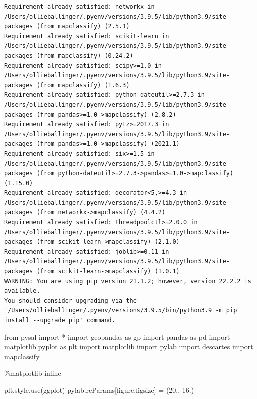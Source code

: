 \documentclass[
  letterpaper,
  DIV=11,
  numbers=noendperiod]{scrreprt}
\newenvironment{Shaded}{\begin{snugshade}}{\end{snugshade}}
\newcommand{\FloatTok}[1]{\textcolor[rgb]{0.68,0.00,0.00}{#1}}
\newcommand{\ImportTok}[1]{\textcolor[rgb]{0.00,0.46,0.62}{#1}}
\newcommand{\NormalTok}[1]{\textcolor[rgb]{0.00,0.23,0.31}{#1}}
\newcommand{\OperatorTok}[1]{\textcolor[rgb]{0.37,0.37,0.37}{#1}}
\newcommand{\StringTok}[1]{\textcolor[rgb]{0.13,0.47,0.30}{#1}}
\begin{document}
\begin{verbatim}
Requirement already satisfied: networkx in /Users/ollieballinger/.pyenv/versions/3.9.5/lib/python3.9/site-packages (from mapclassify) (2.5.1)
Requirement already satisfied: scikit-learn in /Users/ollieballinger/.pyenv/versions/3.9.5/lib/python3.9/site-packages (from mapclassify) (0.24.2)
Requirement already satisfied: scipy>=1.0 in /Users/ollieballinger/.pyenv/versions/3.9.5/lib/python3.9/site-packages (from mapclassify) (1.6.3)
Requirement already satisfied: python-dateutil>=2.7.3 in /Users/ollieballinger/.pyenv/versions/3.9.5/lib/python3.9/site-packages (from pandas>=1.0->mapclassify) (2.8.2)
Requirement already satisfied: pytz>=2017.3 in /Users/ollieballinger/.pyenv/versions/3.9.5/lib/python3.9/site-packages (from pandas>=1.0->mapclassify) (2021.1)
Requirement already satisfied: six>=1.5 in /Users/ollieballinger/.pyenv/versions/3.9.5/lib/python3.9/site-packages (from python-dateutil>=2.7.3->pandas>=1.0->mapclassify) (1.15.0)
Requirement already satisfied: decorator<5,>=4.3 in /Users/ollieballinger/.pyenv/versions/3.9.5/lib/python3.9/site-packages (from networkx->mapclassify) (4.4.2)
Requirement already satisfied: threadpoolctl>=2.0.0 in /Users/ollieballinger/.pyenv/versions/3.9.5/lib/python3.9/site-packages (from scikit-learn->mapclassify) (2.1.0)
Requirement already satisfied: joblib>=0.11 in /Users/ollieballinger/.pyenv/versions/3.9.5/lib/python3.9/site-packages (from scikit-learn->mapclassify) (1.0.1)
WARNING: You are using pip version 21.1.2; however, version 22.2.2 is available.
You should consider upgrading via the '/Users/ollieballinger/.pyenv/versions/3.9.5/bin/python3.9 -m pip install --upgrade pip' command.
\end{verbatim}

\begin{Shaded}
\begin{Highlighting}[]
\ImportTok{from}\NormalTok{ pysal }\ImportTok{import} \OperatorTok{*}
\ImportTok{import}\NormalTok{ geopandas }\ImportTok{as}\NormalTok{ gp}
\ImportTok{import}\NormalTok{ pandas }\ImportTok{as}\NormalTok{ pd}
\ImportTok{import}\NormalTok{ matplotlib.pyplot }\ImportTok{as}\NormalTok{ plt}
\ImportTok{import}\NormalTok{ matplotlib}
\ImportTok{import}\NormalTok{ pylab}
\ImportTok{import}\NormalTok{ descartes}
\ImportTok{import}\NormalTok{ mapclassify}

\OperatorTok{\%}\NormalTok{matplotlib inline}

\NormalTok{plt.style.use(}\StringTok{\textquotesingle{}ggplot\textquotesingle{}}\NormalTok{)}
\NormalTok{pylab.rcParams[}\StringTok{\textquotesingle{}figure.figsize\textquotesingle{}}\NormalTok{] }\OperatorTok{=}\NormalTok{ (}\FloatTok{20.}\NormalTok{, }\FloatTok{16.}\NormalTok{)}
\end{Highlighting}
\end{Shaded}
\end{document}
